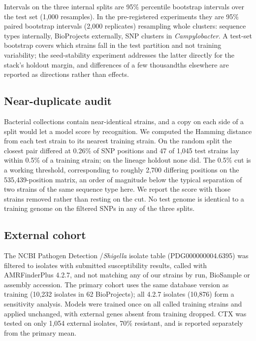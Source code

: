 Intervals on the three internal splits are 95\% percentile bootstrap intervals over the test set
(1,000 resamples). In the pre-registered experiments they are 95\% paired bootstrap intervals
(2,000 replicates) resampling whole clusters: sequence types internally, BioProjects externally,
SNP clusters in \textit{Campylobacter}. A test-set bootstrap covers which strains fall in the test
partition and not training variability; the seed-stability experiment addresses the latter directly
for the stack's holdout margin, and differences of a few thousandths elsewhere are reported as
directions rather than effects.

\subsection*{Near-duplicate audit}
Bacterial collections contain near-identical strains, and a copy on each side of a split would let
a model score by recognition. We computed the Hamming distance from each test strain to its nearest
training strain. On the random split the closest pair differed at 0.26\% of SNP positions and 47 of
1,045 test strains lay within 0.5\% of a training strain; on the lineage holdout none did. The
0.5\% cut is a working threshold, corresponding to roughly 2,700 differing positions on the
535,439-position matrix, an order of magnitude below the typical separation of two strains of the
same sequence type here. We report the score with those strains removed rather than resting on the
cut. No test genome is identical to a training genome on the filtered SNPs in any of the three
splits.

\subsection*{External cohort}
The NCBI Pathogen Detection \Ecoli{}/\textit{Shigella} isolate table (PDG000000004.6395) was
filtered to isolates with submitted susceptibility results, called with AMRFinderPlus 4.2.7, and
not matching any of our strains by run, BioSample or assembly accession. The primary cohort uses
the same database version as training (10,232 isolates in 62 BioProjects); all 4.2.7 isolates
(10,876) form a sensitivity analysis. Models were trained once on all called training strains and
applied unchanged, with external genes absent from training dropped. CTX was tested on only 1,054
external isolates, 70\% resistant, and is reported separately from the primary mean.

